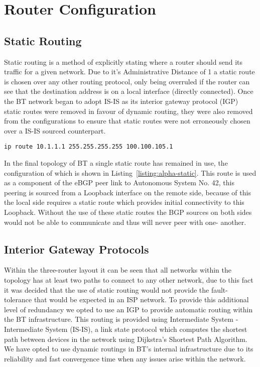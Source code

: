 \chapter{Router Configuration} \section{Static Routing} Static routing is a
method of explicitly stating where a router should send its traffic for a given
network. Due to it's Administrative Distance of 1 a static route is chosen over
any other routing protocol, only being overruled if the router can see that the
destination address is on a local interface (directly connected). Once the BT
network began to adopt IS-IS as its interior gateway protocol (IGP) static
routes were removed in favour of dynamic routing, they were also removed from
the configurations to ensure that static routes were not erroneously chosen over
a IS-IS sourced counterpart.

\begin{lstlisting}[caption={Alpha Static Route}, label={listing:alpha-static}]
ip route 10.1.1.1 255.255.255.255 100.100.105.1
\end{lstlisting}

In the final topology of BT a single static route has remained in use, the
configuration of which is shown in Listing~\ref{listing:alpha-static}. This
route is used as a component of the eBGP peer link to Autonomous System No. 42,
this peering is sourced from a Loopback interface on the remote side, because of
this the local side requires a static route which provides initial connectivity
to this Loopback. Without the use of these static routes the BGP sources on both
sides would not be able to communicate and thus will never peer with one-
another.

\section{Interior Gateway Protocols}

Within the three-router layout it can be seen that all networks within the
topology has at least two paths to connect to any other network, due to this
fact it was decided that the use of static routing would not provide the fault-
tolerance that would be expected in an ISP network. To provide this additional
level of redundancy we opted to use an IGP to provide automatic routing within
the BT infrastructure. This routing is provided using Intermediate System -
Intermediate System (IS-IS), a link state protocol which computes the shortest
path between devices in the network using Dijkstra's Shortest Path Algorithm. We
have opted to use dynamic routings in BT's internal infrastructure due to its
reliability and fast convergence time when any issues arise within the network.

